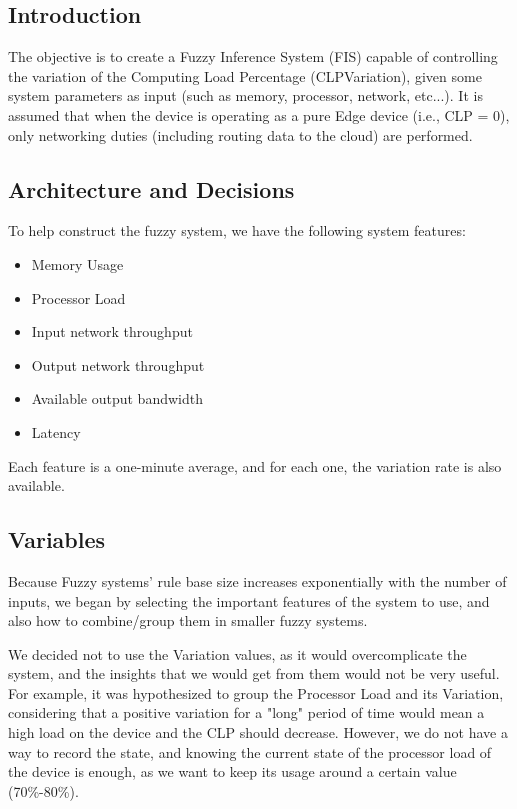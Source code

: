 \subsection{Introduction}

The objective is to create a Fuzzy Inference System (FIS) capable of controlling the variation of the Computing Load Percentage (CLPVariation), given some system parameters as input (such as memory, processor, network, etc...).
It is assumed that when the device is operating as a pure Edge device (i.e., CLP
= 0), only networking duties (including routing data to the cloud) are performed.

\subsection{Architecture and Decisions}

To help construct the fuzzy system, we have the following system features:
\begin{itemize}
    \item Memory Usage
    \item Processor Load
    \item Input network throughput
    \item Output network throughput
    \item Available output bandwidth
    \item Latency
\end{itemize}
Each feature is a one-minute average, and for each one, the variation rate is also available.

\subsection{Variables}

Because Fuzzy systems' rule base size increases exponentially with the number of inputs, we began by selecting the important features of the system to use, and also how to combine/group them in smaller fuzzy systems.

We decided not to use the Variation values, as it would overcomplicate the system, and the insights that we would get from them would not be very useful. For example, it was hypothesized to group the Processor Load and its Variation, considering that a positive variation for a "long" period of time would mean a high load on the device and the CLP should decrease. However, we do not have a way to record the state, and knowing the current state of the processor load of the device is enough, as we want to keep its usage around a certain value (70\%-80\%).

